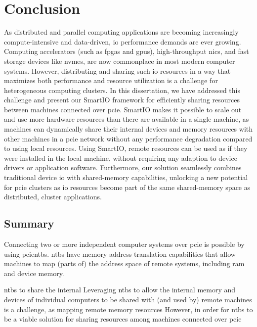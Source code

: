 \chapter{Conclusion}\label{chapter:conclusion}
As distributed and parallel computing applications are becoming increasingly compute-intensive and data-driven, \gls{io} performance demands are ever growing.
%
Computing accelerators (such as \glspl{fpga} and \glspl{gpu}), high-throughput \glspl{nic}, and fast storage devices like \glspl{nvme}, are now commonplace in most modern computer systems.
%
However, distributing and sharing such \gls{io} resources in a way that maximizes both performance and resource utilization is a challenge for heterogeneous computing clusters.
%
In this dissertation, we have addressed this challenge and present our SmartIO framework for efficiently sharing resources between machines connected over \gls{pcie}.
%
SmartIO makes it possible to scale out and use more hardware resources than there are available in a single machine, as machines can dynamically share their internal devices and memory resources with other machines in a \gls{pcie} network without any performance degradation compared to using local resources.
%
Using SmartIO, remote resources can be used as if they were installed in the local machine, without requiring any adaption to device drivers or application software.
%
Furthermore, our solution seamlessly combines traditional device \gls{io} with shared-memory capabilities, unlocking a new potential for \gls{pcie} clusters as \gls{io} resources become part of the same shared-memory space as distributed, cluster applications.




\section{Summary}
Connecting two or more independent computer systems over \gls{pcie} is possible by using \glspl{pcientb}.
%
\Glspl{ntb} have memory address translation capabilities that allow machines to map (parts of) the address space of remote systems, including \gls{ram} and device memory.
%



\glspl{ntb} to share the internal
Leveraging \glspl{ntb} to allow the internal memory and devices of individual computers to be shared with (and used by) remote machines is a challenge, as mapping remote memory resources 
%
However, in order for \glspl{ntb} to be a viable solution for sharing resources among machines connected over \gls{pcie}


